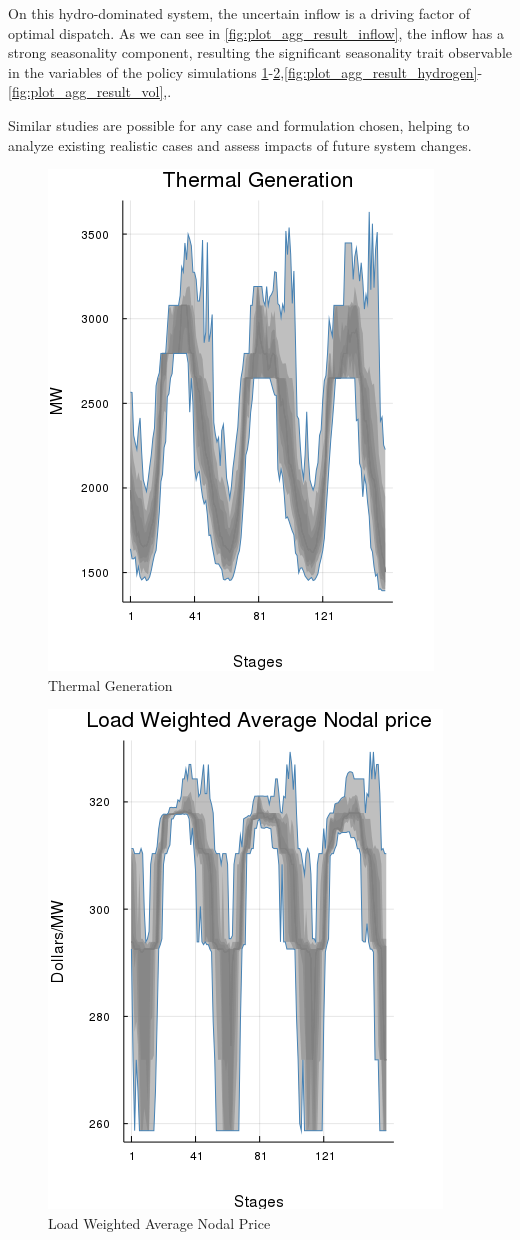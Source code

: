 \documentclass{juliacon}
\begin{document}
On this hydro-dominated system, the uncertain inflow is a driving factor of optimal dispatch. As we can see in \ref{fig:plot_agg_result_inflow}, the inflow has a strong seasonality component, resulting the significant seasonality trait observable in the variables of the policy simulations \ref{fig:plot_agg_result_thermal}-\ref{fig:plot_agg_result_load},\ref{fig:plot_agg_result_hydrogen}-\ref{fig:plot_agg_result_vol},.

Similar studies are possible for any case and formulation chosen, helping to analyze existing realistic cases and assess impacts of future system changes. 

\begin{figure}[H]
\centerline{\includegraphics[width=0.55\linewidth]{fig/plot_agg_result_thermal.png}}
\label{fig:plot_agg_result_thermal}
\caption{Thermal Generation}
\end{figure}

\begin{figure}[H]
\centerline{\includegraphics[width=0.55\linewidth]{fig/plot_agg_result_load.png}}
\caption{Load Weighted Average Nodal Price}
\label{fig:plot_agg_result_load}
\end{figure}
\end{document}
